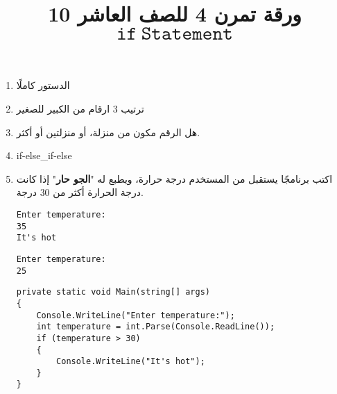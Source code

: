 \documentclass[12pt, twoside]{article}
\title{ورقة تمرن 4 للصف العاشر 10 $\mathtt{if\ Statement}$}
\begin{document}
\maketitle
\thispagestyle{fancy}

\ifdetailed
\begin{enumerate}[itemsep=3em]
\else
\begin{enumerate}
\fi

\item الدستور كاملًا
\item ترتيب 3 ارقام من الكبير للصغير
\item هل الرقم مكون من منزلة، أو منزلتين أو أكثر.
\item if-else\_if-else

\item
اكتب برنامجًا يستقبل من المستخدم درجة حرارة، ويطبع له "\textbf{الجو حار}" إذا كانت درجة الحرارة أكثر من 30 درجة.
\ifdetailed
\begin{boxExample}[1]
\begin{english}
\begin{verbatim}
Enter temperature:
35
It's hot
\end{verbatim}
\end{english}
\end{boxExample}

\begin{boxExample}[2]
\begin{english}
\begin{verbatim}
Enter temperature:
25
\end{verbatim}
\end{english}
\end{boxExample}

\ifwithsols
\begin{boxSolution}
\begin{english}
\begin{verbatim}
private static void Main(string[] args)
{
    Console.WriteLine("Enter temperature:");
    int temperature = int.Parse(Console.ReadLine());
    if (temperature > 30)
    {
        Console.WriteLine("It's hot");
    }
}
\end{verbatim}
\end{english}
\end{boxSolution}
\clearpage
\fi
\fi


\end{enumerate}
\end{enumerate}
\end{document}
